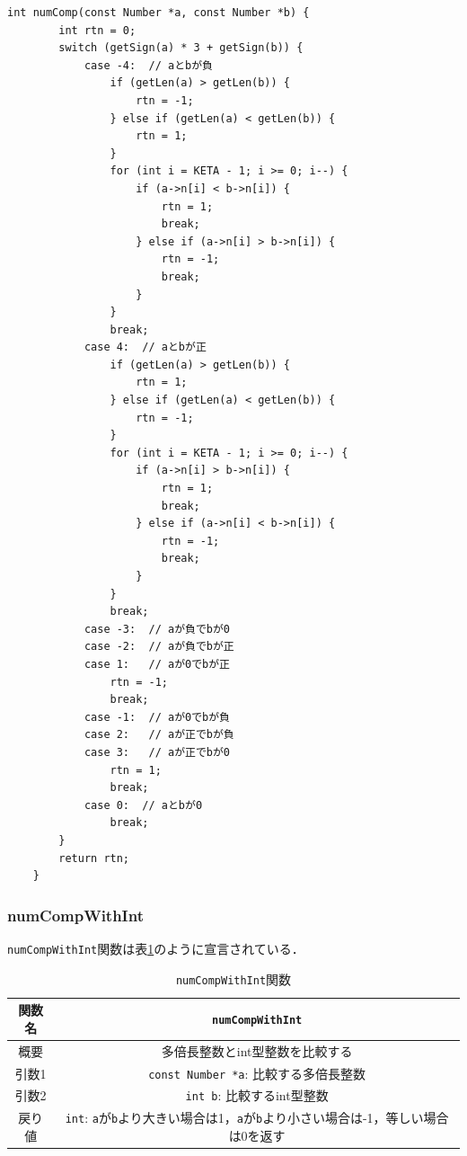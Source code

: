 \documentclass[a4paper,11pt,dvipdfmx]{jsarticle}
\begin{document}
\begin{lstlisting}[caption=\texttt{numComp}関数,label=lst:numCompsrc]
    int numComp(const Number *a, const Number *b) {
        int rtn = 0;
        switch (getSign(a) * 3 + getSign(b)) {
            case -4:  // aとbが負
                if (getLen(a) > getLen(b)) {
                    rtn = -1;
                } else if (getLen(a) < getLen(b)) {
                    rtn = 1;
                }
                for (int i = KETA - 1; i >= 0; i--) {
                    if (a->n[i] < b->n[i]) {
                        rtn = 1;
                        break;
                    } else if (a->n[i] > b->n[i]) {
                        rtn = -1;
                        break;
                    }
                }
                break;
            case 4:  // aとbが正
                if (getLen(a) > getLen(b)) {
                    rtn = 1;
                } else if (getLen(a) < getLen(b)) {
                    rtn = -1;
                }
                for (int i = KETA - 1; i >= 0; i--) {
                    if (a->n[i] > b->n[i]) {
                        rtn = 1;
                        break;
                    } else if (a->n[i] < b->n[i]) {
                        rtn = -1;
                        break;
                    }
                }
                break;
            case -3:  // aが負でbが0
            case -2:  // aが負でbが正
            case 1:   // aが0でbが正
                rtn = -1;
                break;
            case -1:  // aが0でbが負
            case 2:   // aが正でbが負
            case 3:   // aが正でbが0
                rtn = 1;
                break;
            case 0:  // aとbが0
                break;
        }
        return rtn;
    }
\end{lstlisting}

\subsubsection{numCompWithInt}
\texttt{numCompWithInt}関数は表\ref{table:lst:numCompWithInt}のように宣言されている．

\begin{table}[H]
\centering
\caption{\texttt{numCompWithInt}関数}
\label{table:lst:numCompWithInt}
\begin{tabular}{c||c}
\hline
関数名    & \texttt{numCompWithInt}   \\
\hline
概要    & 多倍長整数とint型整数を比較する   \\
\hline
引数1   & \texttt{const Number *a}: 比較する多倍長整数  \\
引数2   & \texttt{int b}: 比較するint型整数  \\
\hline
戻り値    & \texttt{int}: \texttt{a}が\texttt{b}より大きい場合は1，\texttt{a}が\texttt{b}より小さい場合は-1，等しい場合は0を返す   \\
\hline
\end{tabular}
\end{table}
\end{document}
